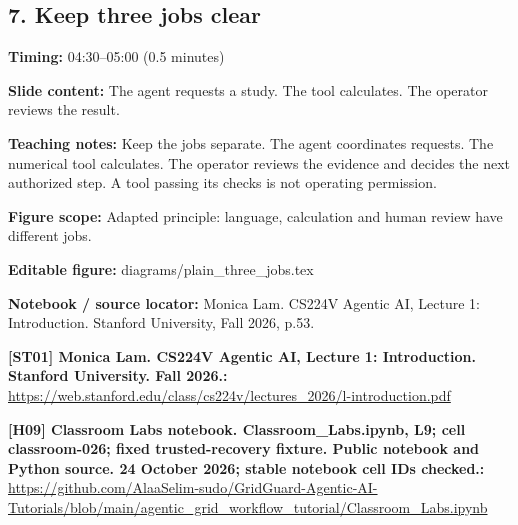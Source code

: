 \documentclass[10pt,letterpaper]{article}
\begin{document}
\subsection*{7. Keep three jobs clear}
\textbf{Timing:} 04:30--05:00 (0.5 minutes)\par
\textbf{Slide content:} The agent requests a study. The tool calculates. The operator reviews the result.\par
\textbf{Teaching notes:} Keep the jobs separate. The agent coordinates requests. The numerical tool calculates. The operator reviews the evidence and decides the next authorized step. A tool passing its checks is not operating permission.\par
\textbf{Figure scope:} Adapted principle: language, calculation and human review have different jobs.\par
\textbf{Editable figure:} diagrams/plain\_three\_jobs.tex\par
\textbf{Notebook / source locator:} Monica Lam. CS224V Agentic AI, Lecture 1: Introduction. Stanford University, Fall 2026, p.53.\par
\textbf{[ST01] Monica Lam. CS224V Agentic AI, Lecture 1: Introduction. Stanford University. Fall 2026.:} \href{https://web.stanford.edu/class/cs224v/lectures_2026/l-introduction.pdf}{\small\ttfamily https:/\allowbreak{}/\allowbreak{}web.\allowbreak{}stanford.\allowbreak{}edu/\allowbreak{}class/\allowbreak{}cs224v/\allowbreak{}lectures\_\allowbreak{}2026/\allowbreak{}l-\allowbreak{}introduction.\allowbreak{}pdf}\par
\textbf{[H09] Classroom Labs notebook. Classroom\_Labs.ipynb, L9; cell classroom-026; fixed trusted-recovery fixture. Public notebook and Python source. 24 October 2026; stable notebook cell IDs checked.:} \href{https://github.com/AlaaSelim-sudo/GridGuard-Agentic-AI-Tutorials/blob/main/agentic_grid_workflow_tutorial/Classroom_Labs.ipynb}{\small\ttfamily https:/\allowbreak{}/\allowbreak{}github.\allowbreak{}com/\allowbreak{}AlaaSelim-\allowbreak{}sudo/\allowbreak{}GridGuard-\allowbreak{}Agentic-\allowbreak{}AI-\allowbreak{}Tutorials/\allowbreak{}blob/\allowbreak{}main/\allowbreak{}agentic\_\allowbreak{}grid\_\allowbreak{}workflow\_\allowbreak{}tutorial/\allowbreak{}Classroom\_\allowbreak{}Labs.\allowbreak{}ipynb}\par
\par\medskip
\end{document}
